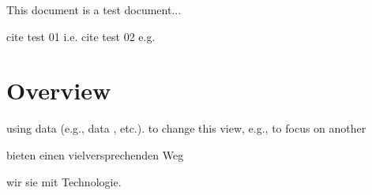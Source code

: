 \documentclass{article}
\begin{document}
This document is a test document...

cite test 01 i.e.
cite test 02 e.g.


\section{Overview}


using data (e.g., data , etc.).
to change this view, e.g., to focus on another

bieten
einen
vielversprechenden
Weg

wir sie mit
Technologie.
\end{document}
